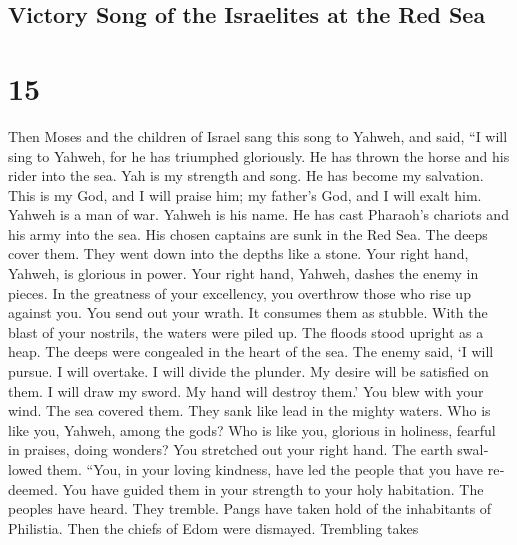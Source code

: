 \begin{paracol}{2}
\switchcolumn
\begin{otherlanguage}{english}

\hypertarget{victory-song-of-the-israelites-at-the-red-sea}{%
\subsection{Victory Song of the Israelites at the Red
Sea}\label{victory-song-of-the-israelites-at-the-red-sea}}

\hypertarget{section-29}{%
\section{15}\label{section-29}}

 Then Moses and the children of Israel sang this song to
Yahweh, and said, ``I will sing to Yahweh, for he has triumphed
gloriously. He has thrown the horse and his rider into the sea.
 Yah is my strength and song. He has become my salvation.
This is my God, and I will praise him; my father's God, and I will exalt
him.  Yahweh is a man of war. Yahweh is his name.
 He has cast Pharaoh's chariots and his army into the sea.
His chosen captains are sunk in the Red Sea.  The deeps
cover them. They went down into the depths like a stone. 
Your right hand, Yahweh, is glorious in power. Your right hand, Yahweh,
dashes the enemy in pieces.  In the greatness of your
excellency, you overthrow those who rise up against you. You send out
your wrath. It consumes them as stubble.  With the blast
of your nostrils, the waters were piled up. The floods stood upright as
a heap. The deeps were congealed in the heart of the sea. 
The enemy said, `I will pursue. I will overtake. I will divide the
plunder. My desire will be satisfied on them. I will draw my sword. My
hand will destroy them.'  You blew with your wind. The
sea covered them. They sank like lead in the mighty waters.
 Who is like you, Yahweh, among the gods? Who is like
you, glorious in holiness, fearful in praises, doing wonders?
 You stretched out your right hand. The earth swallowed
them.  ``You, in your loving kindness, have led the
people that you have redeemed. You have guided them in your strength to
your holy habitation.  The peoples have heard. They
tremble. Pangs have taken hold of the inhabitants of Philistia.
 Then the chiefs of Edom were dismayed. Trembling takes

\end{otherlanguage}
\end{paracol}
